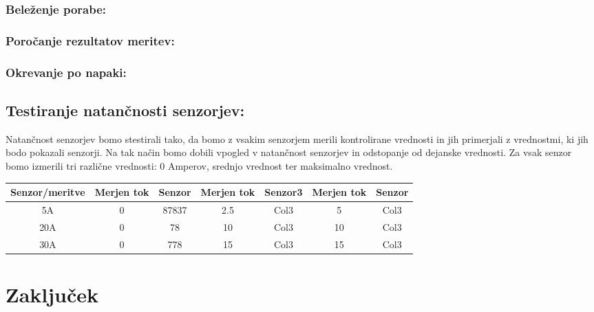 \documentclass[12pt,a4paper,titlepage,openany]{report}
\begin{document}
\subsection{Beleženje porabe:}
\subsection{Poročanje rezultatov meritev:}
\subsection{Okrevanje po napaki:}


\section{Testiranje natančnosti senzorjev:}
\thispagestyle{fancy}

Natančnost senzorjev bomo stestirali tako, da bomo z vsakim senzorjem merili kontrolirane vrednosti in jih primerjali z vrednostmi, ki jih bodo pokazali senzorji. Na tak način bomo dobili vpogled v natančnost senzorjev in odstopanje od dejanske vrednosti. Za vsak senzor bomo izmerili tri različne vrednosti: 0 Amperov, srednjo vrednost ter maksimalno vrednost.



\begin{table}[h!]
\centering
 \begin{tabular}{| c || c c | c  c | c c |} 
 \hline
 Senzor/meritve &  Merjen tok & Senzor & Merjen tok & Senzor3 & Merjen tok  & Senzor\\ [0.5ex] 
 \hline\hline
 5A & 0 & 87837 & 2.5 & Col3 & 5 & Col3 \\ 
 20A & 0 & 78 & 10 & Col3 & 10 & Col3 \\
 30A & 0 & 778 & 15 & Col3 & 15 & Col3\\[1ex] 
 \hline
 \end{tabular}
\end{table}


\chapter{Zaključek}
\thispagestyle{fancy}







\end{document}
